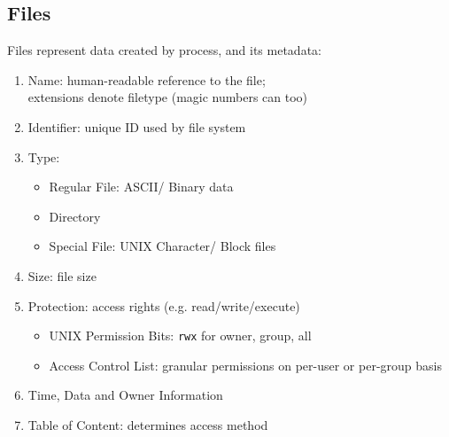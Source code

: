 \documentclass[12pt, a4paper]{article}
\begin{document}
\begin{multicols*}{3}
\subsection{Files}
Files represent data created by process, and its metadata: 
\begin{enumerate}[\roman*.]
  \item Name: human-readable reference to the file;\\extensions denote filetype (magic numbers can too) 
  \item Identifier: unique ID used by file system
  \item Type:\vspace{2pt}
    \begin{itemize}[leftmargin=*]
      \item Regular File: ASCII/ Binary data 
      \item Directory 
      \item Special File: UNIX Character/ Block files
    \end{itemize}
  \item Size: file size 
  \item Protection: access rights (e.g. read/write/execute)\vspace{2pt} 
    \begin{itemize}[leftmargin=*]
      \item UNIX Permission Bits: \lstinline|rwx| for owner, group, all 
      \item Access Control List: granular permissions on per-user or per-group basis
    \end{itemize}
  \item Time, Data and Owner Information 
  \item Table of Content: determines access method 
\end{enumerate}


\end{multicols*}
\end{document}
